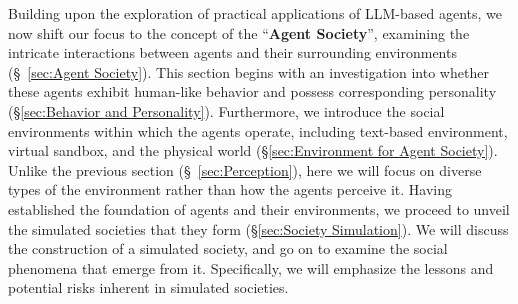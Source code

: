 \documentclass{article}
\begin{document}
Building upon the exploration of practical applications of LLM-based agents, we now shift our focus to the concept of the ``\textbf{Agent Society}'', examining the intricate interactions between agents and their surrounding environments (\S \ \ref{sec:Agent Society}).
This section begins with an investigation into whether these agents exhibit human-like behavior and possess corresponding personality (\S \ref{sec:Behavior and Personality}). 
Furthermore, we introduce the social environments within which the agents operate, including text-based environment, virtual sandbox, and the physical world (\S \ref{sec:Environment for Agent Society}). 
Unlike the previous section (\S \ \ref{sec:Perception}), here we will focus on diverse types of the environment rather than how the agents perceive it.
Having established the foundation of agents and their environments, we proceed to unveil the simulated societies that they form  (\S \ref{sec:Society Simulation}). 
We will discuss the construction of a simulated society, and go on to examine the social phenomena that emerge from it.
Specifically, we will emphasize the lessons and potential risks inherent in simulated societies.

\end{document}
